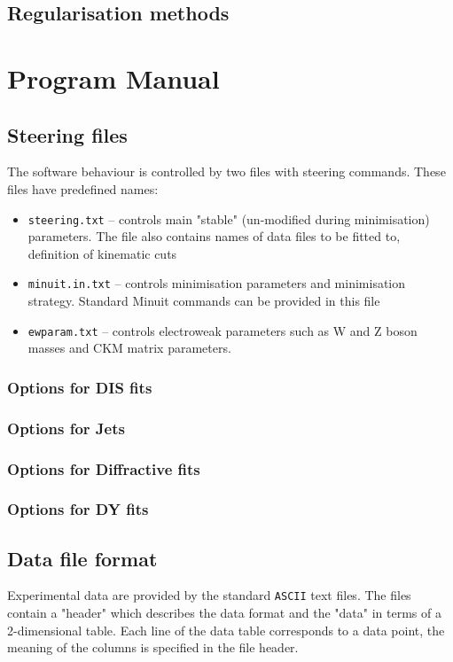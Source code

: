 \documentclass[11pt,a4paper]{article}
\begin{document}
\subsection{Regularisation methods}


\section{Program Manual}
\label{sec:man}
\subsection{Steering files}
    The software behaviour is controlled by two files with steering commands.
    These files have predefined names:
    \begin{itemize}
      \item {\tt steering.txt}  --   controls main "stable" (un-modified during 
                         minimisation) parameters. The file also contains
                         names of data files to be fitted to, definition 
                         of kinematic cuts                              
      \item {\tt minuit.in.txt}
                   --  controls minimisation parameters and minimisation 
                         strategy. Standard Minuit commands can be provided
                         in this file
      \item {\tt ewparam.txt}    --  controls electroweak parameters such
         as W and Z boson masses and CKM matrix parameters.
    \end{itemize}
\subsubsection{Options for DIS fits}
\subsubsection{Options for Jets}
\subsubsection{Options for Diffractive fits}
\subsubsection{Options for DY fits}
\subsection{Data file format}
\label{sec:dataformat}
   Experimental data are provided by the standard {\tt ASCII} text files. The files
   contain a "header" which describes the data format and the "data" in terms
   of a 2-dimensional table. Each line of the data table corresponds to a
   data point, the meaning of the columns is specified in the file header.
\end{document}

